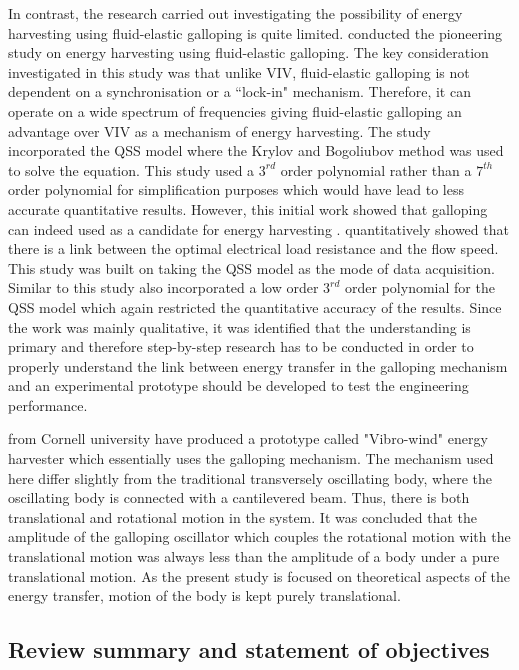 In contrast, the research carried out investigating the possibility of energy harvesting using fluid-elastic galloping is quite limited. \citet{Barrero-Gil2010a} conducted the pioneering study on energy harvesting using fluid-elastic galloping. The key consideration investigated in this study was that unlike VIV, fluid-elastic galloping is not dependent on a synchronisation or a ``lock-in" mechanism. Therefore, it can operate on a wide spectrum of frequencies giving fluid-elastic galloping an advantage over VIV as a mechanism of energy harvesting. The study incorporated the QSS model where the Krylov and Bogoliubov method was used to solve the equation. This study used a $3^{rd}$ order polynomial rather than a $7^{th}$ order polynomial for simplification purposes which would have lead to less accurate quantitative results. However, this initial work showed that galloping can indeed used as a candidate for energy harvesting .\citet{vicente-Ludlam2014} quantitatively showed that there is a link between the optimal electrical load resistance and the flow speed. This study was built on \citet{Barrero-Gil2010a} taking the QSS model as the mode of data acquisition. Similar to \citet{Barrero-Gil2010a} this study also incorporated a low order $3^{rd}$ order polynomial for the QSS model which again restricted the quantitative accuracy of the results. Since the work was mainly qualitative, it was identified that the understanding is primary and therefore step-by-step research has to be conducted in order to properly understand the link between energy transfer in the galloping mechanism and an experimental prototype should be developed to test the engineering performance. 

\citet{Kluger2013} from Cornell university have produced a prototype called "Vibro-wind" energy harvester which essentially uses the galloping mechanism. The mechanism used here differ slightly from the traditional transversely oscillating body, where the oscillating body is connected with a cantilevered beam. Thus, there is both translational and rotational motion in the system. It was concluded that the amplitude of the galloping oscillator which couples the rotational motion with the translational motion was always less than the amplitude of a body under a pure translational motion. As the present study is focused on theoretical aspects of the energy transfer, motion of the body is kept purely translational.   


\subsection{Review summary and statement of objectives}

